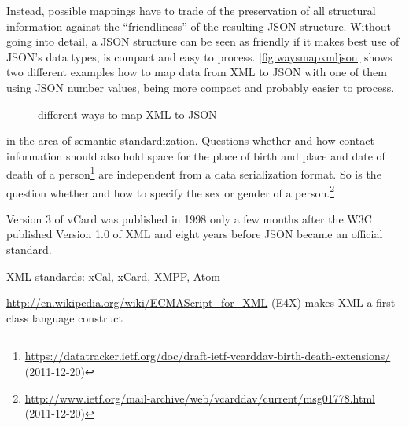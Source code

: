 \documentclass[12pt,a4paper]{scrartcl}		%
\newcommand{\citeurl}[2]{\url{#1} (#2)}
\begin{document}
Instead, possible mappings have to trade of the preservation of all structural
information against the ``friendliness'' of the resulting JSON
structure.\cite{Boyer2011} Without going into detail, a JSON structure can be
seen as friendly if it makes best use of JSON's data types, is compact and easy
to process. \autoref{fig:waysmapxmljson} shows two different examples how to map
data from XML to JSON with one of them using JSON number values, being more
compact and probably easier to process.

\begin{figure}
\captionsetup[subfloat]{justification=raggedright,singlelinecheck=false}
\small{
}
  \caption{different ways to map XML to JSON}
  \label{fig:waysmapxmljson}
\end{figure}



 in the area of semantic
standardization. Questions whether and how contact information should also hold
space for the place of birth and place and date of death of a
person\footnote{\citeurl{https://datatracker.ietf.org/doc/draft-ietf-vcarddav-birth-death-extensions/}{2011-12-20}}
are independent from a data serialization format. So is the question whether and
how to specify the sex or gender of a
person.\footnote{\citeurl{http://www.ietf.org/mail-archive/web/vcarddav/current/msg01778.html}{2011-12-20}}





Version 3 of vCard was published in 1998\cite{RFC2425} only a few months after
the W3C published Version 1.0 of XML\cite{Paoli:98:XR} and eight years before
JSON became an official standard.\cite{RFC4627}

XML standards:
  xCal, xCard, XMPP, Atom

\url{http://en.wikipedia.org/wiki/ECMAScript_for_XML} (E4X) makes XML a first class language construct 
\end{document}
